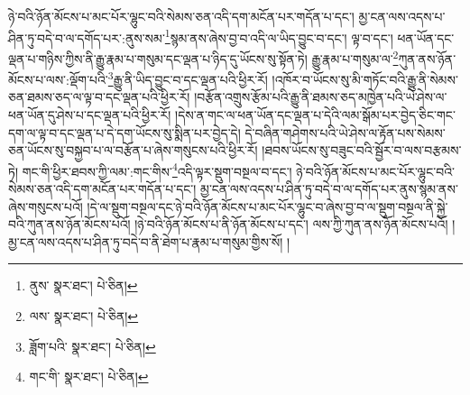 ཉེ་བའི་ཉོན་མོངས་པ་མང་པོར་ལྷུང་བའི་སེམས་ཅན་འདི་དག་མངོན་པར་གདོན་པ་དང་། མྱ་ངན་ལས་འདས་པ་ཤིན་ཏུ་བདེ་བ་ལ་དགོད་པར་:ནུས་སམ་\footnote{ནུས་  སྣར་ཐང་།  པེ་ཅིན། }སྙམ་ནས་ཞེས་བྱ་བ་འདི་ལ་ཡིད་བྱུང་བ་དང་། ལྟ་བ་དང་། ཕན་ཡོན་དང་ལྡན་པ་གཉིས་ཀྱིས་ནི་རྒྱུ་རྣམ་པ་གསུམ་དང་ལྡན་པ་ཉིད་དུ་ཡོངས་སུ་སྟོན་ཏེ། རྒྱུ་རྣམ་པ་གསུམ་ལ་\footnote{ལས་  སྣར་ཐང་།  པེ་ཅིན། }ཀུན་ནས་ཉོན་མོངས་པ་ལས་:ལྡོག་པའི་\footnote{ཟློག་པའི་  སྣར་ཐང་།  པེ་ཅིན། }རྒྱུ་ནི་ཡིད་བྱུང་བ་དང་ལྡན་པའི་ཕྱིར་རོ། །འཁོར་བ་ཡོངས་སུ་མི་གཏོང་བའི་རྒྱུ་ནི་སེམས་ཅན་ཐམས་ཅད་ལ་ལྟ་བ་དང་ལྡན་པའི་ཕྱིར་རོ། །བརྩོན་འགྲུས་རྩོམ་པའི་རྒྱུ་ནི་ཐམས་ཅད་མཁྱེན་པའི་ཡེ་ཤེས་ལ་ཕན་ཡོན་དུ་ཤེས་པ་དང་ལྡན་པའི་ཕྱིར་རོ། །དེས་ན་གང་ལ་ཕན་ཡོན་དང་ལྡན་པ་དེའི་ལམ་སྒོམ་པར་བྱེད་ཅིང་གང་དག་ལ་ལྟ་བ་དང་ལྡན་པ་དེ་དག་ཡོངས་སུ་སྨིན་པར་བྱེད་དེ། དེ་བཞིན་གཤེགས་པའི་ཡེ་ཤེས་ལ་རྟོན་པས་སེམས་ཅན་ཡོངས་སུ་བསྐྱབ་པ་ལ་བརྩོན་པ་ཞེས་གསུངས་པའི་ཕྱིར་རོ། །ཐབས་ཡོངས་སུ་བཟུང་བའི་སྦྱོར་བ་ལས་བརྩམས་ཏེ། གང་གི་ཕྱིར་ཐབས་ཀྱི་ལམ་:གང་གིས་\footnote{གང་གི་  སྣར་ཐང་།  པེ་ཅིན། }འདི་ལྟར་སྡུག་བསྔལ་བ་དང་། ཉེ་བའི་ཉོན་མོངས་པ་མང་པོར་ལྷུང་བའི་སེམས་ཅན་འདི་དག་མངོན་པར་གདོན་པ་དང་། མྱ་ངན་ལས་འདས་པ་ཤིན་ཏུ་བདེ་བ་ལ་དགོད་པར་ནུས་སྙམ་ནས་ཞེས་གསུངས་པའོ། །དེ་ལ་སྡུག་བསྔལ་དང་ཉེ་བའི་ཉོན་མོངས་པ་མང་པོར་ལྷུང་བ་ཞེས་བྱ་བ་ལ་སྡུག་བསྔལ་ནི་སྐྱེ་བའི་ཀུན་ནས་ཉོན་མོངས་པའོ། །ཉེ་བའི་ཉོན་མོངས་པ་ནི་ཉོན་མོངས་པ་དང་། ལས་ཀྱི་ཀུན་ནས་ཉོན་མོངས་པའོ། །མྱ་ངན་ལས་འདས་པ་ཤིན་ཏུ་བདེ་བ་ནི་ཐེག་པ་རྣམ་པ་གསུམ་གྱིས་སོ། །
